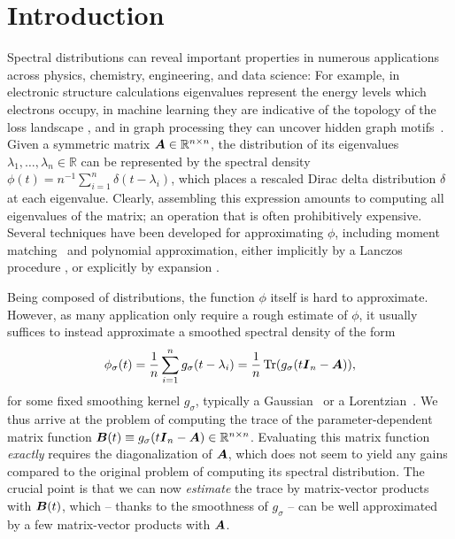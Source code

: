 \section{Introduction}
\label{sec:introduction}

Spectral distributions can reveal important properties in numerous applications across physics, chemistry, engineering, and data science: For example, in electronic structure calculations eigenvalues represent the energy levels which electrons occupy\cite{drabold-1993-maximum-entropy, ducastelle-1970-moments-developments, haydock-1972-electronic-structure, lin-2017-randomized-estimation}, in machine learning they are indicative of the topology of the loss landscape \cite{ghorbani-2019-investigation-neural, yao-2020-pyhessian-neural}, and in graph processing they can uncover hidden graph motifs~\cite{huang-2021-density-states}. Given a symmetric matrix $\boldsymbol{A} \in \mathbb{R}^{n \times n}$, the distribution of its eigenvalues $\lambda_1, \dots, \lambda_n \in \mathbb{R}$ can be represented by the spectral density $\phi(t) = n^{-1} \sum_{i=1}^{n} \delta(t - \lambda_i)$, which places a rescaled Dirac delta distribution $\delta$ at each eigenvalue. Clearly, assembling this expression amounts to computing all eigenvalues of the matrix; an operation that is often prohibitively expensive. Several techniques have been developed for approximating $\phi$, including moment matching~\cite{cohen-steiner-2018-approximating-spectrum, braverman-2022-sublinear-time} and polynomial approximation, either implicitly by a Lanczos procedure \cite{lin-2016-approximating-spectral, chen-2021-analysis-stochastic}, or explicitly by expansion \cite{weisse-2006-kernel-polynomial, lin-2016-approximating-spectral}.

Being composed of distributions, the function $\phi$ itself is hard to approximate. However, as many application only require a rough estimate of $\phi$, it usually suffices to instead approximate a smoothed spectral density of the form
\begin{equation}
    \phi_{\sigma}(t) = \frac{1}{n} \sum_{i=1}^{n} g_{\sigma}(t - \lambda_i) = \frac{1}{n} \operatorname{Tr}(g_{\sigma}(t \boldsymbol{I}_n - \boldsymbol{A})),
    \label{equ:smoothed-spectral-density}
\end{equation}
for some fixed smoothing kernel $g_{\sigma}$, typically a Gaussian~\cite{lin-2016-approximating-spectral, lin-2017-randomized-estimation} or a Lorentzian~\cite{haydock-1972-electronic-structure, lin-2016-approximating-spectral}. We thus arrive at the problem of computing the trace of the parameter-dependent matrix function $\boldsymbol{B}(t) \equiv g_{\sigma}(t \boldsymbol{I}_n - \boldsymbol{A}) \in \mathbb{R}^{n \times n}$. Evaluating this matrix function \emph{exactly} requires the diagonalization of $\boldsymbol{A}$, which does not seem to yield any gains compared to the original problem of computing its spectral distribution. The crucial point is that we can now \emph{estimate} the trace by matrix-vector products with $\boldsymbol{B}(t)$, which -- thanks to the smoothness of $g_\sigma$ -- can be well approximated by a few matrix-vector products with $\boldsymbol{A}$.

